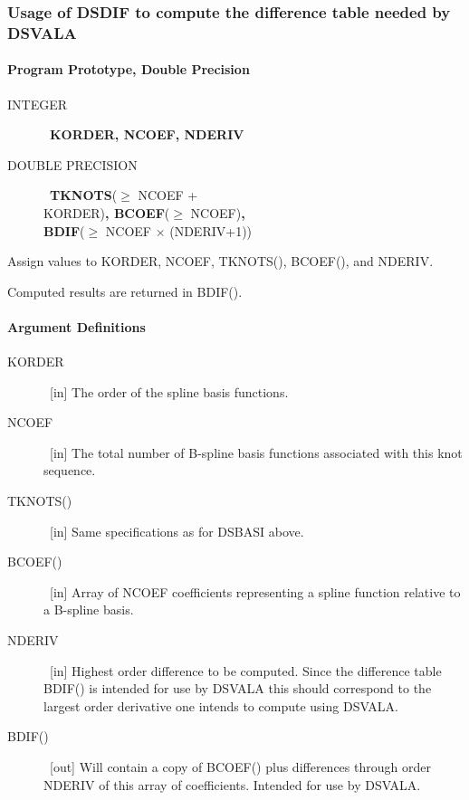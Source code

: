 \documentclass[twoside]{MATH77}
\begin{document}
\subsubsection{Usage of DSDIF to compute the difference table needed by
DSVALA}

\paragraph{Program Prototype, Double Precision}
\begin{description}
\item[INTEGER]  \ {\bf KORDER, NCOEF, NDERIV}

\item[DOUBLE PRECISION]  \ {\bf TKNOTS}($\geq $ NCOEF + \\ KORDER){\bf ,
BCOEF}($\geq $ NCOEF){\bf , \\ BDIF}($\geq $ NCOEF $\times $ (NDERIV+1))
\end{description}
Assign values to KORDER, NCOEF, TKNOTS(), BCOEF(), and NDERIV.
\begin{center}
\end{center}
Computed results are returned in BDIF().

\paragraph{Argument Definitions}
\begin{description}
\item[KORDER]  \ [in] The order of the spline basis functions.

\item[NCOEF]  \ [in] The total number of B-spline basis functions associated
with this knot sequence.

\item[TKNOTS()]  \ [in] Same specifications as for DSBASI above.

\item[BCOEF()]  \ [in] Array of NCOEF coefficients representing a spline
function relative to a B-spline basis.

\item[NDERIV]  \ [in] Highest order difference to be computed. Since the
difference table BDIF() is intended for use by DSVALA this should correspond
to the largest order derivative one intends to compute using DSVALA.

\item[BDIF()]  \ [out] Will contain a copy of BCOEF() plus differences
through order NDERIV of this array of coefficients. Intended for use by
DSVALA.
\end{description}
\end{document}
